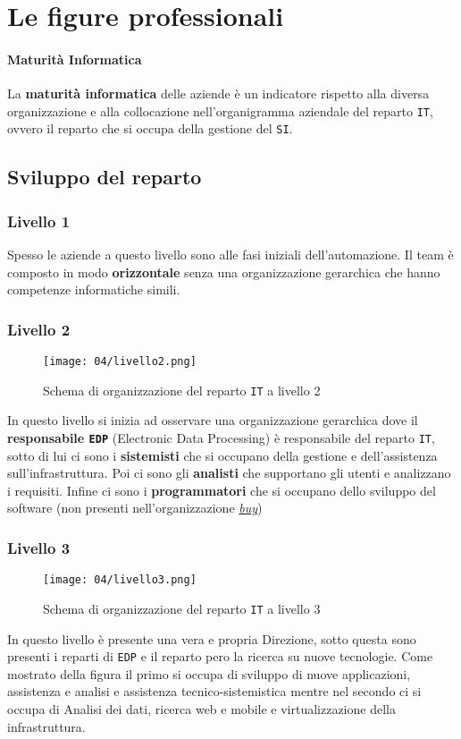 \section{Le figure professionali}
    \paragraph{Maturità Informatica} 
        La \textbf{maturità informatica} delle aziende è un indicatore rispetto alla diversa organizzazione e alla collocazione nell'organigramma aziendale del reparto \texttt{IT}, ovvero il reparto che si occupa della gestione del \texttt{SI}. 
    \subsection{Sviluppo del reparto}
        \subsubsection{Livello 1}
            Spesso le aziende a questo livello sono alle fasi iniziali dell'automazione.
            Il team è composto in modo \textbf{orizzontale} senza una organizzazione gerarchica che hanno competenze informatiche simili.
        \subsubsection{Livello 2}
            \begin{figure}[H]
                \centering 
                \texttt{[image: 04/livello2.png]}
                \caption{Schema di organizzazione del reparto \texttt{IT} a livello 2}
            \end{figure}
            In questo livello si inizia ad osservare una organizzazione gerarchica dove il \textbf{responsabile \texttt{EDP}} (Electronic Data Processing) è responsabile del reparto \texttt{IT}, sotto di lui ci sono i \textbf{sistemisti} che si occupano della gestione e dell'assistenza sull'infrastruttura. Poi ci sono gli \textbf{analisti} che supportano gli utenti e analizzano i requisiti. Infine ci sono i \textbf{programmatori} che si occupano dello sviluppo del software (non presenti nell'organizzazione \hyperref[sec:opzBuy]{\textit{buy}})
        \subsubsection{Livello 3}
            \begin{figure}[H]
                \centering 
                \texttt{[image: 04/livello3.png]}
                \caption{Schema di organizzazione del reparto \texttt{IT} a livello 3}
            \end{figure}
            In questo livello è presente una vera e propria Direzione, sotto questa sono presenti i reparti di \texttt{EDP} e il reparto pero la ricerca su nuove tecnologie. Come mostrato della figura il primo si occupa di sviluppo di nuove applicazioni, assistenza e analisi e assistenza tecnico-sistemistica mentre nel secondo ci si occupa di Analisi dei dati, ricerca web e mobile e virtualizzazione della infrastruttura.
